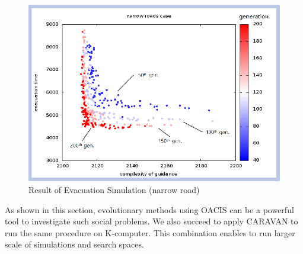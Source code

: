 \begin{figure}
  \centering
  \includegraphics[width=.6\linewidth]{Figs.noda/figure-10.evac_narrow.eps}
  \caption{Result of Evacuation Simulation (narrow road)}
  \label{fig:Figs.noda/figure-10.evac_narrow.eps}
\end{figure}

As shown in this section,
evolutionary methods using OACIS can be a powerful tool
to investigate such social problems.
We also succeed to apply CARAVAN to run the same procedure
on K-computer.
This combination enables to run larger scale of simulations
and search spaces.


